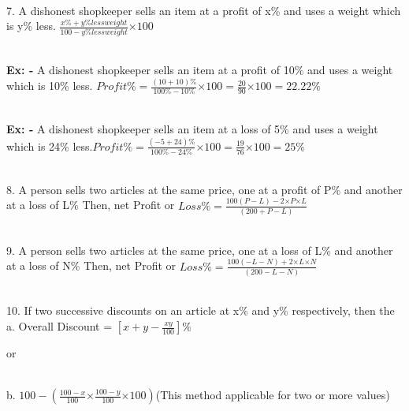 \documentclass{article}
\begin{document}
\noindent 

\noindent 

\noindent 

\noindent \\ 7.   A dishonest shopkeeper sells an item at a profit of x\% and uses a weight which is y\% less. $ \frac{x\% + y\% less weight}{100 - y\%less weight} \mathrm{\times} 100 $

\noindent 

\noindent \\ \textbf{Ex: - }A dishonest shopkeeper sells an item at a profit of 10\% and uses a weight which is 10\% less. $ Profit\% = \frac{(10 +10)\%}{100\% - 10\%} \mathrm{\times} 100 = \frac{20}{90} \mathrm{\times} 100 = 22.22\%$


\noindent \\ \textbf{Ex: - }A dishonest shopkeeper sells an item at a loss of 5\% and uses a weight which is 24\% less.$ Profit\% = \frac{(-5 + 24)\%}{100\% - 24\%} \mathrm{\times} 100 = \frac{19}{76} \mathrm{\times} 100 = 25\%$



\noindent 

\noindent 

\noindent 

\noindent \\ 8.   A person sells two articles at the same price, one at a profit of  P\% and another at a loss of L\% Then, net Profit or $ Loss \% = \frac{100(P-L) - 2 \mathrm{\times} P \mathrm{\times} L}{(200 + P - L)}$



\noindent 

\noindent 

\noindent 

\noindent \\ 9.   A person sells two articles at the same price, one at a loss of  L\% and another at a loss of  N\% 
Then, net Profit or $ Loss \% = \frac{100(-L-N) + 2 \mathrm{\times} L \mathrm{\times} N}{(200 - L - N)}$


\noindent \\ 10. If two successive discounts on an article at x\% and y\% respectively, then the a. Overall Discount = $ [x + y - \frac{xy}{100}]\% $

\noindent 

\noindent or

\noindent 

\noindent \\ b. $ 100 - (\frac{100 - x}{100} \mathrm{\times} \frac{100 - y}{100} \mathrm{\times} 100) $(This method applicable for two or more values)
\end{document}

